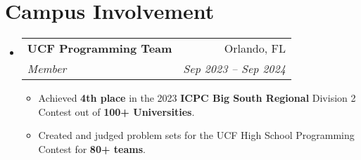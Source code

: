 \documentclass[letterpaper,11pt]{article}
\makeatletter
\newcommand{\resumeItem}[1]{
  \item\small{
    {#1 \vspace{-2pt}}
  }
}
\newcommand{\resumeSubheading}[4]{
  \vspace{-2pt}\item
    \begin{tabular*}{0.97\textwidth}[t]{l@{\extracolsep{\fill}}r}
      \textbf{#1} & #2 \\
      \textit{\small#3} & \textit{\small #4} \\
    \end{tabular*}\vspace{-7pt}
}
\newcommand{\resumeSubHeadingListStart}{\begin{itemize}[leftmargin=0.15in, label={}]}
\newcommand{\resumeSubHeadingListEnd}{\end{itemize}}
\newcommand{\resumeItemListStart}{\begin{itemize}}
\newcommand{\resumeItemListEnd}{\end{itemize}\vspace{-5pt}}
\makeatother
\begin{document}
\section{Campus Involvement}
  \resumeSubHeadingListStart
    \resumeSubheading
      {UCF Programming Team}{Orlando, FL}
      {Member}{Sep 2023 -- Sep 2024}
      \resumeItemListStart
        \resumeItem{Achieved \textbf{4th place} in the 2023 \textbf{ICPC Big South Regional} Division 2 Contest out of \textbf{100+ Universities}.}
        \resumeItem{Created and judged problem sets for the UCF High School Programming Contest for \textbf{80+ teams}.}
      \resumeItemListEnd
  \resumeSubHeadingListEnd
\end{document}
